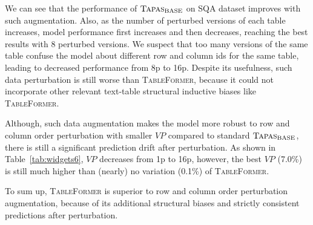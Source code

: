 \documentclass[11pt]{article}
\begin{document}
We can see that the performance of $\textsc{Tapas}_{\text{BASE}}$ on SQA dataset improves with such augmentation. Also, as the number of perturbed versions of each table increases, model performance first increases and then decreases, reaching the best results with 8 perturbed versions. We suspect that too many versions of the same table confuse the model about different row and column ids for the same table, leading to decreased performance from 8p to 16p. Despite its usefulness, such data perturbation is still worse than \textsc{TableFormer}, because it could not incorporate other relevant text-table structural inductive biases like \textsc{TableFormer}. 

Although, such data augmentation makes the model more robust to row and column order perturbation with smaller $VP$ compared to standard $\textsc{Tapas}_{\text{BASE}}$, there is still a significant prediction drift after perturbation. As shown in Table~\ref{tab:widgets6}, $VP$ decreases from 1p to 16p, however, the best $VP$ (7.0\%) is still much higher than (nearly) no variation (0.1\%) of \textsc{TableFormer}.

To sum up, \textsc{TableFormer} is superior to row and column order perturbation augmentation, because of its additional structural biases and strictly consistent predictions after perturbation.
\end{document}
